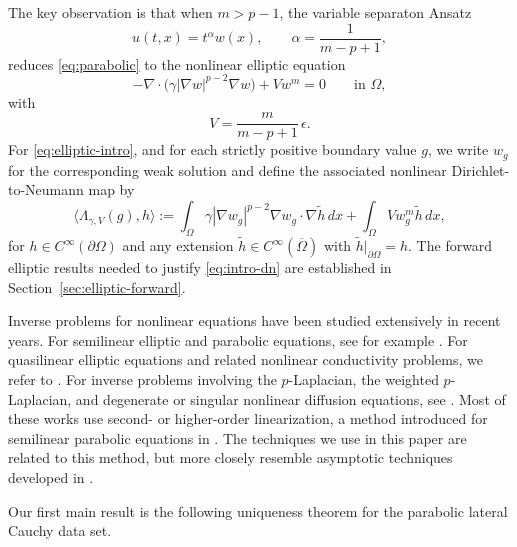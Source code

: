 \documentclass[a4paper,12pt]{article}
\newcommand{\pr}{\partial}
\theoremstyle{definition}
\theoremstyle{remark}
\begin{document}
The key observation is that when $m>p-1$, the variable separaton Ansatz
\[
u(t,x)=t^\alpha w(x),\qquad \alpha=\frac{1}{m-p+1},\]
reduces \eqref{eq:parabolic} to the nonlinear elliptic equation
\begin{equation}\label{eq:elliptic-intro}
-\nabla\cdot\bigl(\gamma|\nabla w|^{p-2}\nabla w\bigr)+Vw^m=0
\qquad \text{in }\Omega,
\end{equation}
with
\begin{equation}\label{eq:V-from-epsilon}
V=\frac{m}{m-p+1}\,\epsilon.
\end{equation}
For \eqref{eq:elliptic-intro}, and for each strictly positive boundary value $g$, we write $w_g$ for the corresponding weak solution and define the associated nonlinear Dirichlet-to-Neumann map by
\begin{equation}\label{eq:intro-dn}
\langle \Lambda_{\gamma,V}(g),h\rangle
:=\int_\Omega \gamma|\nabla w_g|^{p-2}\nabla w_g\cdot\nabla \widetilde h\,dx
+\int_\Omega Vw_g^m\widetilde h\,dx,
\end{equation}
for $h\in C^\infty(\pr\Omega)$ and any extension $\widetilde h\in C^\infty(\overline\Omega)$ with $\widetilde h|_{\pr\Omega}=h$. The forward elliptic results needed to justify \eqref{eq:intro-dn} are established in Section~\ref{sec:elliptic-forward}.

Inverse problems for nonlinear equations have been studied extensively in recent years. For semilinear elliptic and parabolic equations, see for example \cite{Is1,IsSy,IsNa,FeOk,KrUh,KrUh2,LaLiiLinSa1,LaLiiLinSa2,Sun2}. For quasilinear elliptic equations and related nonlinear conductivity problems, we refer to  \cite{HeSun,Sun1,SunUh,Sun3,KaNa,EgPiSc,CarNaVa,CarFeKiKrUh,MuUh,Sh,CarFe1,CarFe2, Car2}. For inverse problems involving the $p$-Laplacian, the weighted $p$-Laplacian, and degenerate or singular nonlinear diffusion equations, see \cite{Br,BrKaSa,BrHaKaSa,BrIlKa,GuKaSa,KaWa,SaZh,CarKa,CarGhNa,CarGhUh,CarFe3, CarZim}. Most of these works use second- or higher-order linearization, a method introduced for semilinear parabolic equations in \cite{Is1}. The techniques we use in this paper are related to this method, but more closely resemble asymptotic techniques developed in \cite{CarKa, CarFe3, Car2, CarZim}.

Our first main result is the following uniqueness theorem for the parabolic lateral Cauchy data set.
\end{document}
